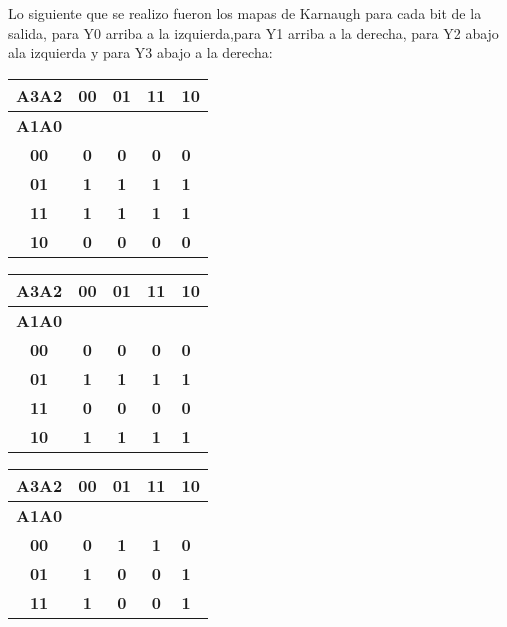 Lo siguiente que se realizo fueron los mapas de Karnaugh para cada bit de la salida, para Y0 arriba a la izquierda,para Y1 arriba a la derecha, para Y2 abajo ala izquierda y para Y3 abajo a la derecha:
\begin{table}[htb] 
\centering
\begin{tabular}{|c|c|c|c|l|}
\hline
\textbf{A3A2} & \textbf{00} & \textbf{01} & \textbf{11} & \textbf{10} \\ \hline
\textbf{A1A0} & \multicolumn{4}{c|}{\textbf{}}                        \\ \hline
\textbf{00}   & \textbf{0}  & \textbf{0}  & \textbf{0}  & \textbf{0}  \\ \hline
\textbf{01}   & \textbf{1}  & \textbf{1}  & \textbf{1}  & \textbf{1}  \\ \hline
\textbf{11}   & \textbf{1}  & \textbf{1}  & \textbf{1}  & \textbf{1}  \\ \hline
\textbf{10}   & \textbf{0}  & \textbf{0}  & \textbf{0}  & \textbf{0}  \\ \hline
\end{tabular}
\begin{tabular}{|c|c|c|c|l|}
\hline
\textbf{A3A2} & \textbf{00} & \textbf{01} & \textbf{11} & \textbf{10} \\ \hline
\textbf{A1A0} & \multicolumn{4}{c|}{\textbf{}}                        \\ \hline
\textbf{00}   & \textbf{0}  & \textbf{0}  & \textbf{0}  & \textbf{0}  \\ \hline
\textbf{01}   & \textbf{1}  & \textbf{1}  & \textbf{1}  & \textbf{1}  \\ \hline
\textbf{11}   & \textbf{0}  & \textbf{0}  & \textbf{0}  & \textbf{0}  \\ \hline
\textbf{10}   & \textbf{1}  & \textbf{1}  & \textbf{1}  & \textbf{1}  \\ \hline
\end{tabular}
\begin{tabular}{|c|c|c|c|l|}
\hline
\textbf{A3A2} & \textbf{00} & \textbf{01} & \textbf{11} & \textbf{10} \\ \hline
\textbf{A1A0} & \multicolumn{4}{c|}{\textbf{}}                        \\ \hline
\textbf{00}   & \textbf{0}  & \textbf{1}  & \textbf{1}  & \textbf{0}  \\ \hline
\textbf{01}   & \textbf{1}  & \textbf{0}  & \textbf{0}  & \textbf{1}  \\ \hline
\textbf{11}   & \textbf{1}  & \textbf{0}  & \textbf{0}  & \textbf{1}  \\ \hline

\end{tabular}
\end{table}
